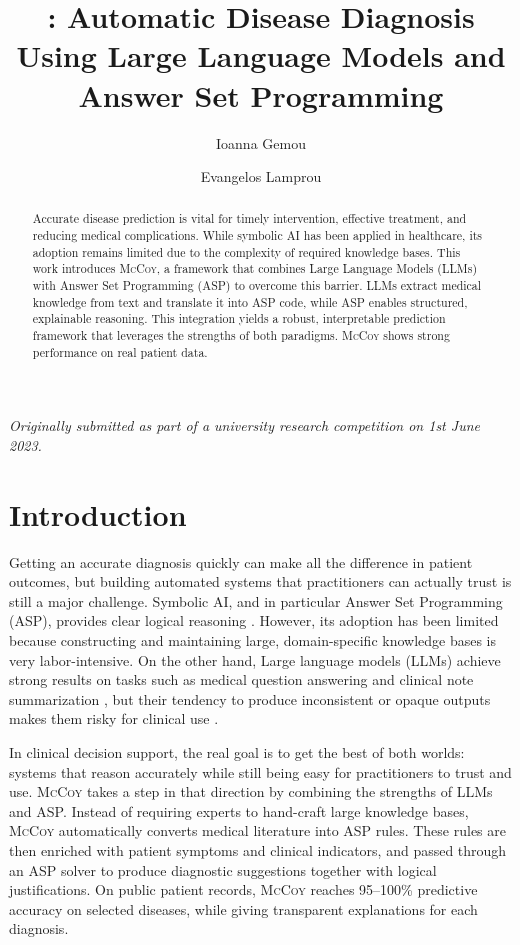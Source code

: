 \documentclass[11pt,leqno]{amsart}
\title[\sys: Automatic Disease Diagnosis Using LLMs \& ASP]{\sys: Automatic Disease Diagnosis Using Large Language Models and Answer Set Programming}
\author[Ioanna Gemou]{Ioanna Gemou}
\author[Evangelos Lamprou]{Evangelos Lamprou}
\newcommand{\sys}{\textsc{McCoy}\xspace}
\begin{document}
\maketitle
\vspace{-1.5em} %
{\small\itshape \centering Originally submitted as part of a university research competition on 1st June 2023.\par}
\vspace{0.5em} %

\begin{abstract}
Accurate disease prediction is vital for timely intervention, 
effective treatment, and reducing medical complications. 
While symbolic AI has been applied in healthcare, 
its adoption remains limited due to the complexity 
of required knowledge bases.
This work introduces \sys, a framework that combines Large Language Models (LLMs) 
with Answer Set Programming (ASP) to overcome this barrier. 
LLMs extract medical knowledge from text and translate it into ASP code, 
while ASP enables structured, explainable reasoning. 
This integration yields a robust, interpretable prediction framework 
that leverages the strengths of both paradigms. 
\sys shows strong performance on real patient data.
\end{abstract}

\section{Introduction}
Getting an accurate diagnosis quickly can make all the difference in patient outcomes, 
but building automated systems that practitioners can actually trust is still a major challenge. 
Symbolic AI, and in particular Answer Set Programming (ASP), provides clear logical reasoning \cite{Brewka2011,Gelfond_Kahl_2014}. 
However, its adoption has been limited because constructing and maintaining large, 
domain-specific knowledge bases is very labor-intensive.
On the other hand, Large language models (LLMs) achieve strong results on tasks
such as medical question answering and clinical note summarization \cite{Singhal2022LargeLM,Singhal2023,Zheng2024LLMmed}, 
but their tendency to produce inconsistent or opaque outputs makes them risky for clinical use \cite{aljohani2025comprehensivesurveytrustworthinesslarge, rudin2019stopexplainingblackbox}.

In clinical decision support, the real goal is to get the best of both worlds: 
systems that reason accurately while still being easy for practitioners to trust and use. 
\sys takes a step in that direction by combining the strengths of LLMs and ASP. 
Instead of requiring experts to hand-craft large knowledge bases, 
\sys automatically converts medical literature into ASP rules. 
These rules are then enriched with patient symptoms and clinical indicators, 
and passed through an ASP solver to produce diagnostic suggestions together with logical justifications.
On public patient records, \sys reaches 95–100\% predictive accuracy on selected diseases, 
while giving transparent explanations for each diagnosis.
\end{document}
